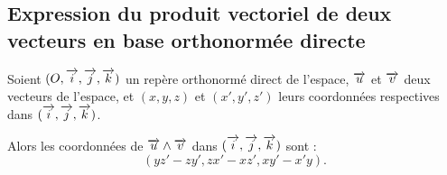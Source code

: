 \documentclass[10pt,oneside]{article}
\begin{document}
\subsection{Expression du produit vectoriel de deux vecteurs en base orthonormée directe}

\begin{propo}
Soient $(O, \overrightarrow{i}, \overrightarrow{j}, \overrightarrow{k})$ un repère orthonormé direct de l'espace, $\overrightarrow{u}$ et $\overrightarrow{v}$ deux vecteurs de l'espace, et $(x,y,z)$ et $(x',y',z')$ leurs coordonnées respectives dans $(\overrightarrow{i}, \overrightarrow{j}, \overrightarrow{k})$.

Alors les coordonnées de $\overrightarrow{u}\wedge\overrightarrow{v}$ dans $(\overrightarrow{i}, \overrightarrow{j}, \overrightarrow{k})$ sont  :
$$(yz'-zy',zx'-xz',xy'-x'y).$$
\end{propo}
\end{document}
